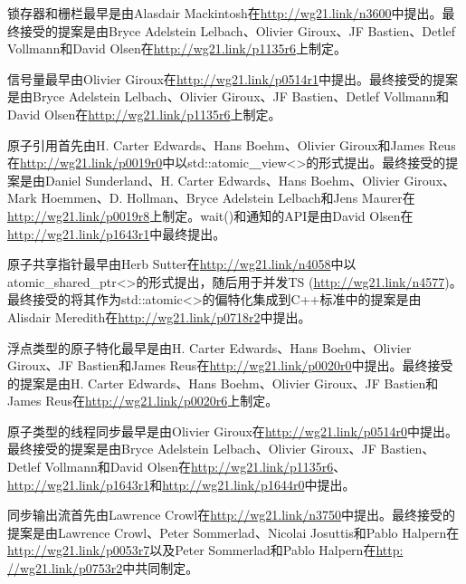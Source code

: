 锁存器和栅栏最早是由Alasdair Mackintosh在\url{http://wg21.link/n3600}中提出。最终接受的提案是由Bryce Adelstein Lelbach、Olivier Giroux、JF Bastien、Detlef Vollmann和David Olsen在\url{http://wg21.link/p1135r6}上制定。

信号量最早由Olivier Giroux在\url{http://wg21.link/p0514r1}中提出。最终接受的提案是由Bryce Adelstein Lelbach、Olivier Giroux、JF Bastien、Detlef Vollmann和David Olsen在\url{http://wg21.link/p1135r6}上制定。

原子引用首先由H. Carter Edwards、Hans Boehm、Olivier Giroux和James Reus在\url{http://wg21.link/p0019r0}中以std::atomic＿view<>的形式提出。最终接受的提案是由Daniel Sunderland、H. Carter Edwards、Hans Boehm、Olivier Giroux、Mark Hoemmen、D. Hollman、Bryce Adelstein Lelbach和Jens Maurer在\url{http://wg21.link/p0019r8}上制定。wait()和通知的API是由David Olsen在\url{http://wg21.link/p1643r1}中最终提出。

原子共享指针最早由Herb Sutter在\url{http://wg21.link/n4058}中以atomic\_shared\_ptr<>的形式提出，随后用于并发TS (\url{http://wg21.link/n4577})。最终接受的将其作为std::atomic<>的偏特化集成到C++标准中的提案是由Alisdair Meredith在\url{http://wg21.link/p0718r2}中提出。

浮点类型的原子特化最早是由H. Carter Edwards、Hans Boehm、Olivier Giroux、JF Bastien和James Reus在\url{http://wg21.link/p0020r0}中提出。最终接受的提案是由H. Carter Edwards、Hans Boehm、Olivier Giroux、JF Bastien和James Reus在\url{http://wg21.link/p0020r6}上制定。

原子类型的线程同步最早是由Olivier Giroux在\url{http://wg21.link/p0514r0}中提出。最终接受的提案是由Bryce Adelstein Lelbach、Olivier Giroux、JF Bastien、Detlef Vollmann和David Olsen在\url{http://wg21.link/p1135r6}、\url{http://wg21.link/p1643r1}和\url{http://wg21.link/p1644r0}中提出。

同步输出流首先由Lawrence Crowl在\url{http://wg21.link/n3750}中提出。最终接受的提案是由Lawrence Crowl、Peter Sommerlad、Nicolai Josuttis和Pablo Halpern在\url{http://wg21.link/p0053r7}以及Peter Sommerlad和Pablo Halpern在\url{http: //wg21.link/p0753r2}中共同制定。

